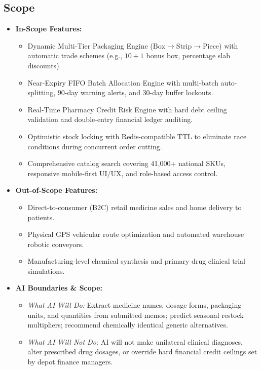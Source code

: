 \documentclass[12pt,a4paper]{article}
\begin{document}
\subsection{Scope}
\begin{itemize}
    \item \textbf{In-Scope Features:}
    \begin{itemize}
        \item Dynamic Multi-Tier Packaging Engine ($\text{Box} \to \text{Strip} \to \text{Piece}$) with automatic trade schemes (e.g., $10+1$ bonus box, percentage slab discounts).
        \item Near-Expiry FIFO Batch Allocation Engine with multi-batch auto-splitting, 90-day warning alerts, and 30-day buffer lockouts.
        \item Real-Time Pharmacy Credit Risk Engine with hard debt ceiling validation and double-entry financial ledger auditing.
        \item Optimistic stock locking with Redis-compatible TTL to eliminate race conditions during concurrent order cutting.
        \item Comprehensive catalog search covering 41,000+ national SKUs, responsive mobile-first UI/UX, and role-based access control.
    \end{itemize}
    \item \textbf{Out-of-Scope Features:}
    \begin{itemize}
        \item Direct-to-consumer (B2C) retail medicine sales and home delivery to patients.
        \item Physical GPS vehicular route optimization and automated warehouse robotic conveyors.
        \item Manufacturing-level chemical synthesis and primary drug clinical trial simulations.
    \end{itemize}
    \item \textbf{AI Boundaries \& Scope:}
    \begin{itemize}
        \item \textit{What AI Will Do:} Extract medicine names, dosage forms, packaging units, and quantities from submitted memos; predict seasonal restock multipliers; recommend chemically identical generic alternatives.
        \item \textit{What AI Will Not Do:} AI will not make unilateral clinical diagnoses, alter prescribed drug dosages, or override hard financial credit ceilings set by depot finance managers.
    \end{itemize}
\end{itemize}
\end{document}
